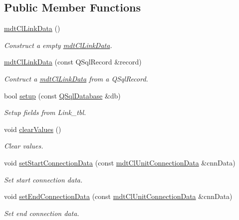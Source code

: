 \subsection*{Public Member Functions}
\begin{DoxyCompactItemize}
\item 
\hyperlink{classmdt_cl_link_data_a43587d0adedeaa563bff5c7d98ffeb0e}{mdt\-Cl\-Link\-Data} ()
\begin{DoxyCompactList}\small\item\em Construct a empty \hyperlink{classmdt_cl_link_data}{mdt\-Cl\-Link\-Data}. \end{DoxyCompactList}\item 
\hyperlink{classmdt_cl_link_data_a654881d20f94810391926752112a775a}{mdt\-Cl\-Link\-Data} (const Q\-Sql\-Record \&record)
\begin{DoxyCompactList}\small\item\em Contruct a \hyperlink{classmdt_cl_link_data}{mdt\-Cl\-Link\-Data} from a Q\-Sql\-Record. \end{DoxyCompactList}\item 
bool \hyperlink{classmdt_cl_link_data_aea3186af58d6718f510e1fe509c6ffe4}{setup} (const \hyperlink{class_q_sql_database}{Q\-Sql\-Database} \&db)
\begin{DoxyCompactList}\small\item\em Setup fields from Link\-\_\-tbl. \end{DoxyCompactList}\item 
void \hyperlink{classmdt_cl_link_data_ae9505b7ba0d120d9c42e8fff20fe6ec7}{clear\-Values} ()
\begin{DoxyCompactList}\small\item\em Clear values. \end{DoxyCompactList}\item 
void \hyperlink{classmdt_cl_link_data_a3f7d2e28043cf19aaa2d8cd3e15d4fe3}{set\-Start\-Connection\-Data} (const \hyperlink{classmdt_cl_unit_connection_data}{mdt\-Cl\-Unit\-Connection\-Data} \&cnn\-Data)
\begin{DoxyCompactList}\small\item\em Set start connection data. \end{DoxyCompactList}\item 
void \hyperlink{classmdt_cl_link_data_ab693d2c53b3b0aa7d6f34b857078cb80}{set\-End\-Connection\-Data} (const \hyperlink{classmdt_cl_unit_connection_data}{mdt\-Cl\-Unit\-Connection\-Data} \&cnn\-Data)
\begin{DoxyCompactList}\small\item\em Set end connection data. \end{DoxyCompactList}\item 

\end{DoxyCompactItemize}
